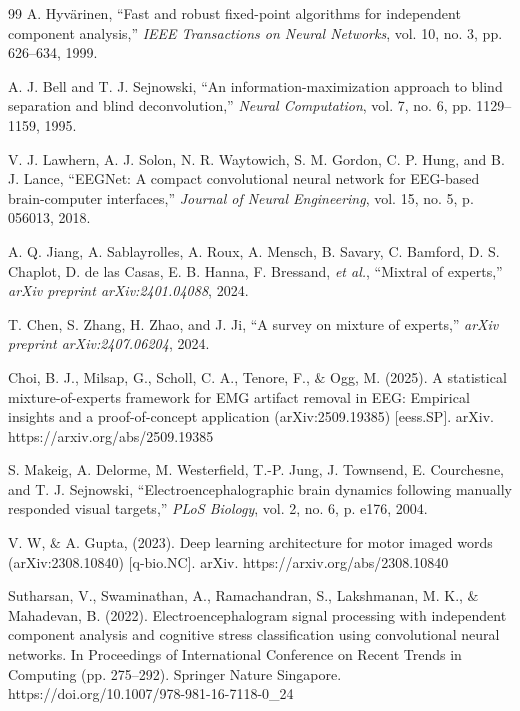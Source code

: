 \documentclass{article}
\begin{document}
\begin{thebibliography}{99}
A. Hyv\"{a}rinen, ``Fast and robust fixed-point algorithms for independent component analysis,'' \textit{IEEE Transactions on Neural Networks}, vol. 10, no. 3, pp. 626--634, 1999.

A. J. Bell and T. J. Sejnowski, ``An information-maximization approach to blind separation and blind deconvolution,'' \textit{Neural Computation}, vol. 7, no. 6, pp. 1129--1159, 1995.

V. J. Lawhern, A. J. Solon, N. R. Waytowich, S. M. Gordon, C. P. Hung, and B. J. Lance, ``EEGNet: A compact convolutional neural network for EEG-based brain-computer interfaces,'' \textit{Journal of Neural Engineering}, vol. 15, no. 5, p. 056013, 2018.

A. Q. Jiang, A. Sablayrolles, A. Roux, A. Mensch, B. Savary, C. Bamford, D. S. Chaplot, D. de las Casas, E. B. Hanna, F. Bressand, \textit{et al.}, ``Mixtral of experts,'' \textit{arXiv preprint arXiv:2401.04088}, 2024.

T. Chen, S. Zhang, H. Zhao, and J. Ji, ``A survey on mixture of experts,'' \textit{arXiv preprint arXiv:2407.06204}, 2024.

Choi, B. J., Milsap, G., Scholl, C. A., Tenore, F., $\&$ Ogg, M. (2025). A statistical mixture-of-experts framework for EMG artifact removal in EEG: Empirical insights and a proof-of-concept application (arXiv:2509.19385) [eess.SP]. arXiv. https://arxiv.org/abs/2509.19385

S. Makeig, A. Delorme, M. Westerfield, T.-P. Jung, J. Townsend, E. Courchesne, and T. J. Sejnowski, ``Electroencephalographic brain dynamics following manually responded visual targets,'' \textit{PLoS Biology}, vol. 2, no. 6, p. e176, 2004.

V. W, $\&$ A. Gupta,  (2023). Deep learning architecture for motor imaged words (arXiv:2308.10840) [q-bio.NC]. arXiv. https://arxiv.org/abs/2308.10840

Sutharsan, V., Swaminathan, A., Ramachandran, S., Lakshmanan, M. K., $\&$ Mahadevan, B. (2022). Electroencephalogram signal processing with independent component analysis and cognitive stress classification using convolutional neural networks. In Proceedings of International Conference on Recent Trends in Computing (pp. 275–292). Springer Nature Singapore. https://doi.org/10.1007/978-981-16-7118-0\_24


\end{thebibliography}
\end{document}
